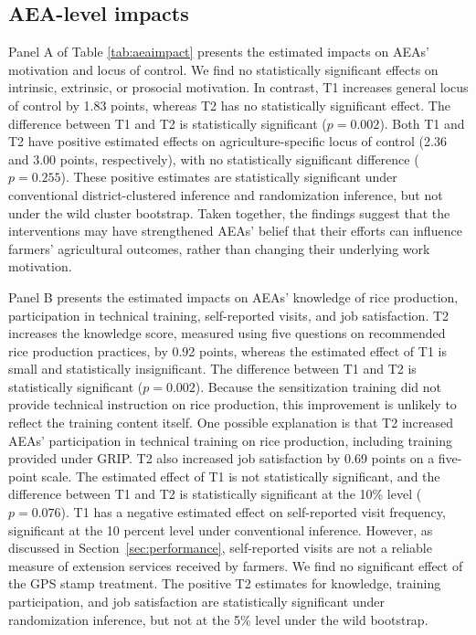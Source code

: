 \documentclass[11pt]{article}
\begin{document}
\subsection{AEA-level impacts}
Panel A of Table \ref{tab:aeaimpact} presents the estimated impacts on AEAs' motivation and locus of control. We find no statistically significant effects on intrinsic, extrinsic, or prosocial motivation. In contrast, T1 increases general locus of control by 1.83 points, whereas T2 has no statistically significant effect. The difference between T1 and T2 is statistically significant ($p=0.002$). Both T1 and T2 have positive estimated effects on agriculture-specific locus of control (2.36 and 3.00 points, respectively), with no statistically significant difference ($p=0.255$). These positive estimates are statistically significant under conventional district-clustered inference and randomization inference, but not under the wild cluster bootstrap. Taken together, the findings suggest that the interventions may have strengthened AEAs' belief that their efforts can influence farmers' agricultural outcomes, rather than changing their underlying work motivation. 

Panel B presents the estimated impacts on AEAs' knowledge of rice production, participation in technical training, self-reported visits, and job satisfaction. T2 increases the knowledge score, measured using five questions on recommended rice production practices, by 0.92 points, whereas the estimated effect of T1 is small and statistically insignificant. The difference between T1 and T2 is statistically significant ($p=0.002$). Because the sensitization training did not provide technical instruction on rice production, this improvement is unlikely to reflect the training content itself. One possible explanation is that T2 increased AEAs' participation in technical training on rice production, including training provided under GRIP. T2 also increased job satisfaction by 0.69 points on a five-point scale. The estimated effect of T1 is not statistically significant, and the difference between T1 and T2 is statistically significant at the 10\% level ($p=0.076$). T1 has a negative estimated effect on self-reported visit frequency, significant at the 10 percent level under conventional inference. However, as discussed in Section~\ref{sec:performance}, self-reported visits are not a reliable measure of extension services received by farmers. We find no significant effect of the GPS stamp treatment. The positive T2 estimates for knowledge, training participation, and job satisfaction are statistically significant under randomization inference, but not at the 5\% level under the wild bootstrap.
\end{document}
